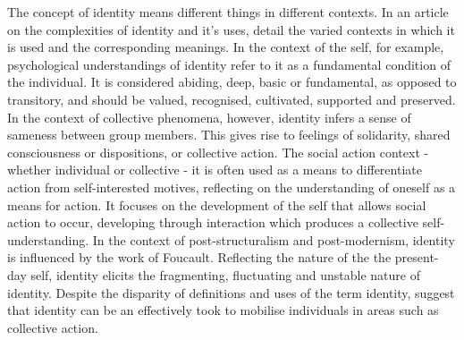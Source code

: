 The concept of identity means different things in different contexts. In an article on the complexities of identity and it's uses, \citet{Brubaker2000} detail the varied contexts in which it is used and the corresponding meanings. In the context of the self, for example, psychological understandings of identity refer to it as a fundamental condition of the individual. It is considered abiding, deep, basic or fundamental, as opposed to transitory, and should be valued, recognised, cultivated, supported and preserved. In the context of collective phenomena, however, identity infers a sense of sameness between group members. This gives rise to feelings of solidarity, shared consciousness or dispositions, or collective action. The social action context - whether individual or collective - it is often used as a means to differentiate action from self-interested motives, reflecting on the understanding of oneself as a means for action. It focuses on the development of the self that allows social action to occur, developing through interaction which produces a collective self-understanding. In the context of post-structuralism and post-modernism, identity is influenced by the work of Foucault. Reflecting the nature of the the present-day self, identity elicits the fragmenting, fluctuating and unstable nature of identity. Despite the disparity of definitions and uses of the term identity, \citet{Brubaker2000} suggest that identity can be an effectively took to mobilise individuals in areas such as collective action. 


